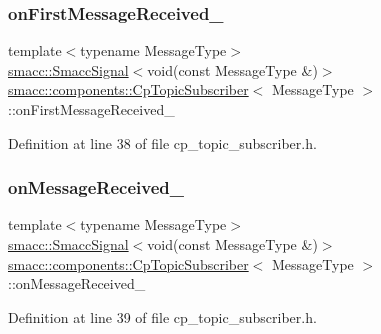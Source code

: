 \subsubsection{\texorpdfstring{on\+First\+Message\+Received\+\_\+}{onFirstMessageReceived\_}}
{\footnotesize\ttfamily template$<$typename Message\+Type$>$ \\
\hyperlink{classsmacc_1_1SmaccSignal}{smacc\+::\+Smacc\+Signal}$<$void(const Message\+Type \&)$>$ \hyperlink{classsmacc_1_1components_1_1CpTopicSubscriber}{smacc\+::components\+::\+Cp\+Topic\+Subscriber}$<$ Message\+Type $>$\+::on\+First\+Message\+Received\+\_\+}



Definition at line 38 of file cp\+\_\+topic\+\_\+subscriber.\+h.

\mbox{\label{classsmacc_1_1components_1_1CpTopicSubscriber_aeec04e64cad880bd49d401c2a474c6e9}} 
\subsubsection{\texorpdfstring{on\+Message\+Received\+\_\+}{onMessageReceived\_}}
{\footnotesize\ttfamily template$<$typename Message\+Type$>$ \\
\hyperlink{classsmacc_1_1SmaccSignal}{smacc\+::\+Smacc\+Signal}$<$void(const Message\+Type \&)$>$ \hyperlink{classsmacc_1_1components_1_1CpTopicSubscriber}{smacc\+::components\+::\+Cp\+Topic\+Subscriber}$<$ Message\+Type $>$\+::on\+Message\+Received\+\_\+}



Definition at line 39 of file cp\+\_\+topic\+\_\+subscriber.\+h.

\mbox{\label{classsmacc_1_1components_1_1CpTopicSubscriber_a9e1c210ebc8d5ef0c837e8bd9b83f754}} 
